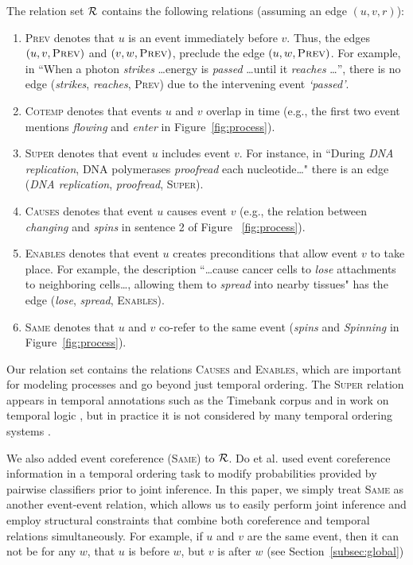 The relation set $\mathcal{R}$ contains the following relations (assuming an edge $(u,v,r)$):
\begin{enumerate}[itemsep=0pt,topsep=0pt] 
\item \textsc{Prev} denotes that $u$ is an event immediately before $v$. Thus, the edges $(u,v,\mbox{\textsc{Prev}})$ and $(v,w,\mbox{\textsc{Prev}})$, preclude the edge $(u,w,\mbox{\textsc{Prev}})$. For example, in ``When a photon \emph{strikes} \ldots energy is  \emph{passed} \ldots until it \emph{reaches} \ldots'', there is no edge (\emph{strikes}, \emph{reaches}, \textsc{Prev}) due to the intervening event \emph{`passed'}.
\item \textsc{Cotemp} denotes that events $u$ and $v$ overlap in time (e.g., the first two event mentions \emph{flowing} and \emph{enter} in Figure~\ref{fig:process}).
\item \textsc{Super} denotes that event $u$ includes event $v$. For instance, in ``During \emph{DNA replication}, DNA polymerases \emph{proofread} each nucleotide\ldots" there is an edge (\emph{DNA replication}, \emph{proofread}, \textsc{Super}).
\item \textsc{Causes} denotes that event $u$ causes event $v$ (e.g., the relation between \emph{changing} and \emph{spins} in sentence 2 of Figure ~\ref{fig:process}).
\item \textsc{Enables} denotes that event $u$ creates preconditions that allow event $v$ to take place. For example, the description ``\ldots cause cancer cells  to \emph{lose} attachments to neighboring cells\ldots, allowing them to \emph{spread} into nearby tissues" has the edge (\emph{lose}, \emph{spread}, \textsc{Enables}).
\item \textsc{Same} denotes that $u$ and $v$ co-refer to the same event (\emph{spins} and \emph{Spinning} in  Figure~\ref{fig:process}).
\end{enumerate}

Our relation set contains the relations \textsc{Causes} and \textsc{Enables}, which are important for modeling processes and go beyond just temporal ordering. The \textsc{Super} relation appears in temporal annotations such as the Timebank corpus \cite{Pustejovsky03} and in work on temporal logic \cite{Allen83}, but in practice it is not considered by many temporal ordering systems \cite{Chambers08,Yoshikawa09,Do12}. 

We also added event coreference (\textsc{Same}) to $\mathcal{R}$. Do et al.  used event coreference information in a temporal ordering task to modify probabilities provided by pairwise classifiers prior to joint inference. In this paper, we simply treat \textsc{Same} as another event-event relation, which allows us to easily perform joint inference and employ structural constraints that combine both coreference and temporal relations simultaneously. For example, if $u$ and $v$ are the same event, then it can not be for any $w$, that $u$ is before $w$, but $v$ is after $w$ (see Section~\ref{subsec:global})

